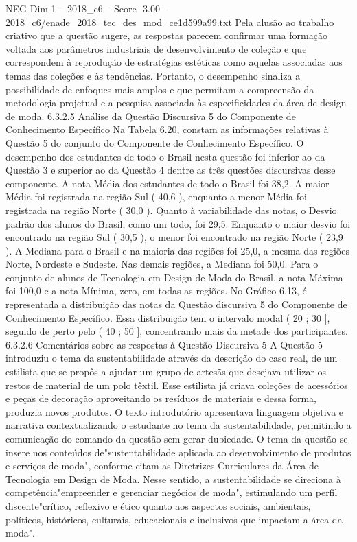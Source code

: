 \begin{textsample}{NEG Dim 1 – 2018\_c6 – Score -3.00 – 2018\_c6/enade\_2018\_tec\_des\_mod\_ce1d599a99.txt}
Pela alusão ao trabalho criativo que a questão sugere, as respostas parecem confirmar uma formação voltada aos parâmetros industriais de desenvolvimento de coleção e que correspondem à reprodução de estratégias estéticas como aquelas associadas aos temas das coleções e às tendências.
Portanto, o desempenho sinaliza a possibilidade de enfoques mais amplos e que permitam a compreensão da metodologia projetual e a pesquisa associada às especificidades da área de design de moda. 6.3.2.5 Análise da Questão Discursiva 5 do Componente de Conhecimento Específico Na Tabela 6.20, constam as informações relativas à Questão 5 do conjunto do Componente de Conhecimento Específico.
O desempenho dos estudantes de todo o Brasil nesta questão foi inferior ao da Questão 3 e superior ao da Questão 4 dentre as três questões discursivas desse componente.
A nota Média dos estudantes de todo o Brasil foi 38,2.
A maior Média foi registrada na região Sul ( 40,6 ), enquanto a menor Média foi registrada na região Norte ( 30,0 ).
Quanto à variabilidade das notas, o Desvio padrão dos alunos do Brasil, como um todo, foi 29,5.
Enquanto o maior desvio foi encontrado na região Sul ( 30,5 ), o menor foi encontrado na região Norte ( 23,9 ).
A Mediana para o Brasil e na maioria das regiões foi 25,0, a mesma das regiões Norte, Nordeste e Sudeste.
Nas demais regiões, a Mediana foi 50,0.
Para o conjunto de alunos de Tecnologia em Design de Moda do Brasil, a nota Máxima foi 100,0 e a nota Mínima, zero, em todas as regiões.
No Gráfico 6.13, é representada a distribuição das notas da Questão discursiva 5 do Componente de Conhecimento Específico.
Essa distribuição tem o intervalo modal ( 20 ; 30 ], seguido de perto pelo ( 40 ; 50 ], concentrando mais da metade dos participantes. 6.3.2.6 Comentários sobre as respostas à Questão Discursiva 5 A Questão 5 introduziu o tema da sustentabilidade através da descrição do caso real, de um estilista que se propôs a ajudar um grupo de artesãs que desejava utilizar os restos de material de um polo têxtil.
Esse estilista já criava coleções de acessórios e peças de decoração aproveitando os resíduos de materiais e dessa forma, produzia novos produtos.
O texto introdutório apresentava linguagem objetiva e narrativa contextualizando o estudante no tema da sustentabilidade, permitindo a comunicação do comando da questão sem gerar dubiedade.
O tema da questão se insere nos conteúdos de"sustentabilidade aplicada ao desenvolvimento de produtos e serviços de moda", conforme citam as Diretrizes Curriculares da Área de Tecnologia em Design de Moda.
Nesse sentido, a sustentabilidade se direciona à competência"empreender e gerenciar negócios de moda", estimulando um perfil discente"crítico, reflexivo e ético quanto aos aspectos sociais, ambientais, políticos, históricos, culturais, educacionais e inclusivos que impactam a área da moda".

\end{textsample}
